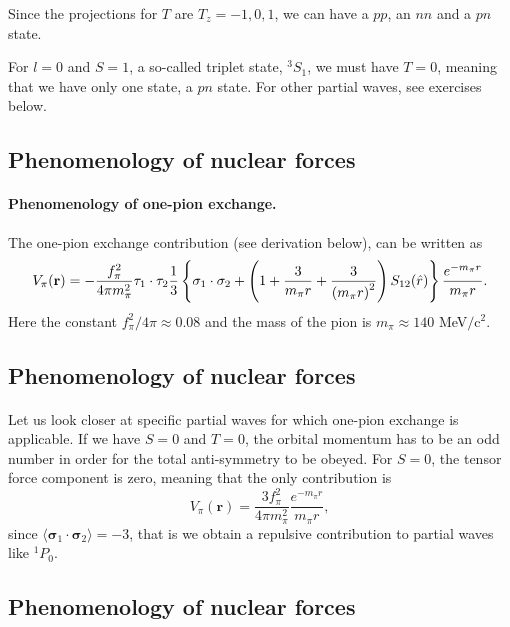 \documentclass[%
twoside,                 %
final,                   %
10pt]{article}
\begin{document}
Since the projections for $T$ are $T_z=-1,0,1$, we can have a $pp$, an $nn$ and a $pn$ state.

For $l=0$ and $S=1$, a so-called triplet state, $^3S_1$, we must have $T=0$, meaning that we have only one state, a $pn$ state. For other partial waves, see exercises below.



\subsection*{Phenomenology of nuclear forces}

\paragraph{Phenomenology of one-pion exchange.}

The one-pion exchange contribution (see derivation below), can be written as 
\[
V_{\pi}(\mathbf{r})= -\frac{f_{\pi}^{2}}{4\pi m_{\pi}^{2}}\mathbf{ \tau}_1\cdot\mathbf{\tau}_2
\frac{1}{3}\left\{\mathbf{ \sigma}_1\cdot\mathbf{ \sigma}_2+\left( 1 + {3\over m_\pi r} + {3\over\left(m_\pi r\right)^2}\right) S_{12} (\hat r)\right\} \frac{e^{-m_\pi r}}{m_\pi r}.
\]
Here the constant $f_{\pi}^{2}/4\pi\approx 0.08$ and the mass of the pion is $m_\pi\approx 140$ MeV$/\mbox{c}^2$.


\subsection*{Phenomenology of nuclear forces}

\paragraph{}
Let us look closer at specific partial waves for which one-pion exchange is applicable. If we have $S=0$ and $T=0$, the 
orbital momentum has to be an odd number in order for the total anti-symmetry to be obeyed. For $S=0$, the tensor force component is zero, meaning that 
the only contribution is 
\[
V_{\pi}(\mathbf{r})=\frac{3f_{\pi}^{2}}{4\pi m_{\pi}^{2}}\frac{e^{-m_\pi r}}{m_\pi r},
\]
since $\langle\mathbf{ \sigma}_1\cdot\mathbf{ \sigma}_2\rangle=-3$, that is we obtain a repulsive contribution to partial waves like 
$^1P_0$.


\subsection*{Phenomenology of nuclear forces}
\end{document}
